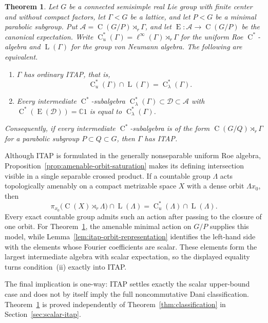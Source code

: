 \documentclass[11pt]{amsart}
\numberwithin{equation}{section}
\newcommand{\C}{\mathbb{C}}
\newcommand{\rL}{\operatorname{L}}
\newcommand{\rC}{\operatorname{C}}
\newcommand{\rE}{\operatorname{E}}
\newtheorem{mainobstruction}{Theorem}
\theoremstyle{definition}
\begin{document}
	\begin{mainobstruction}\label{thm:semisimple-itap-obstruction}
		Let \(G\) be a connected semisimple real Lie group with finite center and
		without compact factors, let \(\Gamma<G\) be a lattice, and let \(P<G\) be a
		minimal parabolic subgroup. Put
		\(\mathcal A=\rC(G/P)\rtimes_r\Gamma\), and let
		\(\rE:\mathcal A\to\rC(G/P)\) be the canonical expectation. Write
		\(\rC_u^*(\Gamma)=\ell^\infty(\Gamma)\rtimes_r\Gamma\) for the uniform Roe
		\(\rC^*\)-algebra and \(\rL(\Gamma)\) for the group von Neumann algebra. The following are
		equivalent.
		\begin{enumerate}[\rm (i)]
			\item \(\Gamma\) has ordinary {\rm ITAP}, that is,
			\[
			\rC_u^*(\Gamma)\cap\rL(\Gamma)=\rC^*_{\lambda}(\Gamma).
			\]
			\item Every intermediate \(\rC^*\)-subalgebra
			\(\rC^*_{\lambda}(\Gamma)\subset\mathcal D\subset\mathcal A\) with
		\(\rC^*(\rE(\mathcal D))=\C1\) is equal to
			\(\rC^*_{\lambda}(\Gamma)\).
		\end{enumerate}
		Consequently, if every intermediate \(\rC^*\)-subalgebra is of the form
		\(\rC(G/Q)\rtimes_r\Gamma\) for a parabolic subgroup
		\(P\subset Q\subset G\), then \(\Gamma\) has {\rm ITAP}.
	\end{mainobstruction}

	Although {\rm ITAP} is formulated in the generally nonseparable uniform Roe
	algebra, Proposition~\ref{prop:amenable-orbit-saturation} makes its defining
	intersection visible in a single separable crossed product. If a countable group
	\(\Lambda\) acts topologically amenably on a compact metrizable space \(X\) with
	a dense orbit \(\Lambda x_0\), then
	\[
	\pi_{x_0}\bigl(\rC(X)\rtimes_r\Lambda\bigr)\cap\rL(\Lambda)
	=
	\rC_u^*(\Lambda)\cap\rL(\Lambda).
	\]
	Every exact countable group admits such an action after passing to the closure
	of one orbit. For Theorem~\ref{thm:semisimple-itap-obstruction}, the amenable
	minimal action on \(G/P\) supplies this model, while
	Lemma~\ref{lem:itap-orbit-representation} identifies the left-hand side with
	the elements whose Fourier coefficients are scalar. These elements form the
	largest intermediate algebra with scalar expectation, so the displayed equality
	turns condition~{\rm (ii)} exactly into {\rm ITAP}.
	
	The final implication is one-way: {\rm ITAP} settles exactly the scalar upper-bound case and does not by itself imply the full noncommutative Dani classification. Theorem~\ref{thm:semisimple-itap-obstruction} is proved independently of Theorem~\ref{thm:classification} in Section~\ref{sec:scalar-itap}.
	
\end{document}

